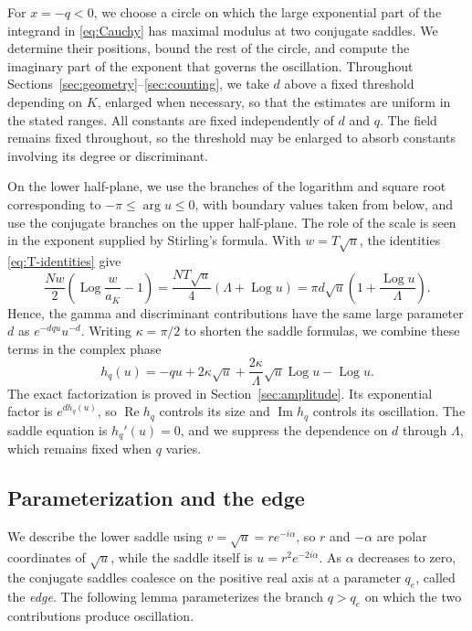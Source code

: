 \documentclass[11pt,reqno]{amsart}
\numberwithin{equation}{section}
\DeclareMathOperator{\Log}{Log}
\renewcommand{\Re}{\operatorname{Re}}
\renewcommand{\Im}{\operatorname{Im}}
\begin{document}
For $x=-q<0$, we choose a circle on which the large exponential
part of the integrand in \eqref{eq:Cauchy} has maximal modulus
at two conjugate saddles. We determine their positions, bound the
rest of the circle, and compute the
imaginary part of the exponent that governs the oscillation.
Throughout Sections~\ref{sec:geometry}--\ref{sec:counting},
we take $d$ above a fixed threshold depending on $K$, enlarged when
necessary, so that the estimates are uniform in the stated ranges.
All constants are fixed independently of $d$ and $q$. The field
remains fixed throughout, so the threshold may be enlarged to
absorb constants involving its degree or discriminant.

On the lower half-plane, we use the branches of the logarithm
and square root corresponding to $-\pi\le\arg u\le0$, with
boundary values taken from below, and use the conjugate branches
on the upper half-plane. The role of the scale is seen in the
exponent supplied by Stirling's formula. With $w=T\sqrt u$, the
identities \eqref{eq:T-identities} give
\begin{equation}\label{eq:scale-exponent}
 \frac{Nw}{2}\left(\Log\frac{w}{a_K}-1\right)
 =\frac{NT\sqrt u}{4}(\Lambda+\Log u)
 =\pi d\sqrt u\left(1+\frac{\Log u}{\Lambda}\right).
\end{equation}
Hence, the gamma and discriminant contributions have the same large parameter $d$ as
$e^{-dqu}u^{-d}$. Writing $\kappa=\pi/2$ to shorten the saddle
formulas, we combine these terms in the complex phase
\begin{equation}\label{eq:phase-definition}
 h_q(u)=-qu+2\kappa\sqrt u
             +\frac{2\kappa}{\Lambda}\sqrt u\Log u-\Log u.
\end{equation}
The exact factorization is proved in Section~\ref{sec:amplitude}.
Its exponential factor is $e^{dh_q(u)}$, so $\Re h_q$ controls
its size and $\Im h_q$ controls its oscillation. The saddle
equation is $h_q'(u)=0$, and we suppress the dependence on $d$
through $\Lambda$, which remains fixed when $q$ varies.

\subsection{Parameterization and the edge}

We describe the lower saddle using $v=\sqrt u=re^{-i\alpha}$,
so $r$ and $-\alpha$ are polar coordinates of $\sqrt u$, while
the saddle itself is $u=r^2e^{-2i\alpha}$. As $\alpha$ decreases
to zero, the conjugate saddles coalesce on the positive real axis
at a parameter $q_e$, called the \emph{edge}. The following lemma
parameterizes the branch $q>q_e$ on which the two contributions
produce oscillation.
\end{document}
